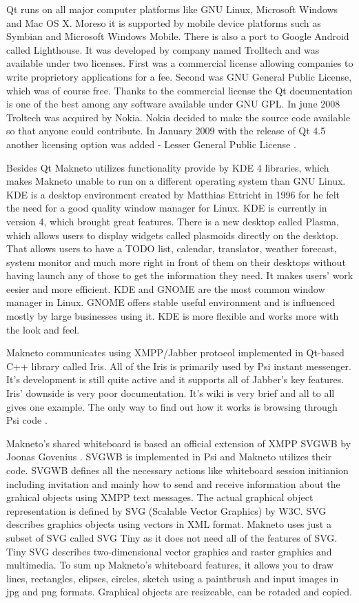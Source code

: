 Qt runs on all major computer platforms like GNU Linux, Microsoft Windows and Mac OS X. Moreso it is supported by mobile device platforms such as Symbian and Microsoft Windows Mobile. There is also a port to Google Android called Lighthouse. It was developed by company named Trolltech and was available under two licenses. First was a commercial license allowing companies to write proprietory applications for a fee. Second was GNU General Public License, which was of course free. Thanks to the commercial license the Qt documentation is one of the best among any software available under GNU GPL. In june 2008 Troltech was acquired by Nokia. Nokia decided to make the source code available so that anyone could contribute. In January 2009 with the release of Qt 4.5 another licensing option was added - Lesser General Public License \cite{qtBook,Qt}.

Besides Qt Makneto utilizes functionality provide by KDE 4 \cite{KDE} libraries, which makes Makneto unable to run on a different operating system than GNU Linux. KDE is a desktop environment created by Matthias Ettricht in 1996 for he felt the need for a good quality window manager for Linux. KDE is currently in version 4, which brought great features. There is a new desktop called Plasma, which allows users to display widgets called plasmoids directly on the desktop. That allows users to have a TODO list, calendar, translator, weather forecast, system monitor and much more right in front of them on their desktops without having launch any of those to get the information they need. It makes users' work eesier and more efficient. KDE and GNOME are the most common window manager in Linux. GNOME offers stable useful environment and is influenced mostly by large businesses using it. KDE is more flexible and works more with the look and feel.

Makneto communicates using XMPP/Jabber protocol implemented in Qt-based C++ library called Iris. All of the Iris is primarily used by Psi instant messenger. It's development is still quite active and it supports all of Jabber's key features. Iris' downside is very poor documentation. It's wiki is very brief and all to all gives one example. The only way to find out how it works is browsing through Psi code \cite{irisWiki}.

Makneto's shared whiteboard is based an official extension of XMPP SVGWB by Joonas Govenius \cite{SVGWB}. SVGWB is implemented in Psi and Makneto utilizes their code. SVGWB defines all the necessary actions like whiteboard session initianion including invitation and mainly how to send and receive information about the grahical objects using XMPP text messages. The actual graphical object representation is defined by SVG \cite{SVG}(Scalable Vector Graphics) by W3C. SVG describes graphics objects using vectors in XML format. Makneto uses just a subset of SVG called SVG Tiny \cite{SVGtiny} as it does not need all of the features of SVG. Tiny SVG describes two-dimensional vector graphics and raster graphics and multimedia. To sum up Makneto's whiteboard features, it allows you to draw lines, rectangles, elipses, circles, sketch using a paintbrush and input images in jpg and png formats. Graphical objects are resizeable, can be rotaded and copied.  


